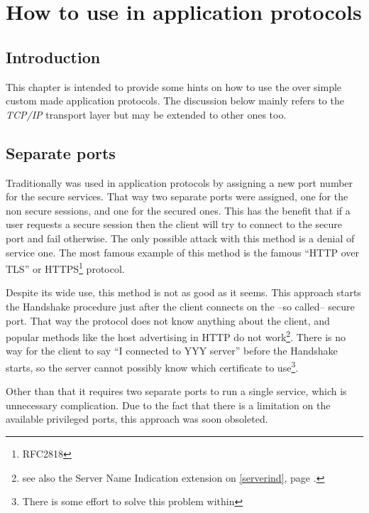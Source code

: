\chapter{How to use \tls{} in application protocols}
\label{apps}

\section{Introduction}
This chapter is intended to provide some hints on how to use the \tls{}
over simple custom made application protocols. 
The discussion below mainly refers to the \emph{TCP/IP} transport layer
but may be extended to other ones too.

\section{Separate ports}

Traditionally \ssl{} was used in application protocols by assigning 
a new port number for the secure services. That way two separate 
ports were assigned, one for the
non secure sessions, and one for the secured ones. This has the benefit
that if a user requests a secure session then the client will try to
connect to the secure port and fail otherwise. The only possible attack
with this method is a denial of service one. The most famous
example of this method is the famous ``HTTP over TLS'' or HTTPS\footnote{RFC2818} 
protocol.
\par
Despite its wide use, this method is not as good as it seems.
This approach starts the \tls{} Handshake procedure just after the
client connects on the --so called-- secure port. 
That way the \tls{} protocol does not know anything
about the client, and popular methods like the host advertising in 
HTTP do not work\footnote{see also the Server Name Indication extension on \ref{serverind}, page \pageref{serverind}.}. 
There is no way for the client to say ``I connected
to YYY server'' before the Handshake starts, so the server cannot
possibly know which certificate to use\footnote{There is some effort to solve
this problem within \tls{}}.

\par
Other than that it requires two separate ports to run a single service, which is 
unnecessary complication. Due to the fact that there is a limitation on 
the available privileged ports, this approach was soon obsoleted.


